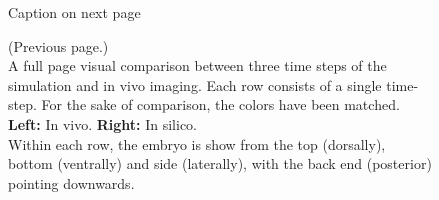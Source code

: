 \begin{figure}[H]
    \centering
    \vspace*{-1cm}\hspace*{-1cm}
    \caption{Caption on next page}
    \label{fig:big-visual-comparison}
\end{figure}
\newpage
\addtocounter{figure}{-1}
\begin{figure} [t!]
  \caption{(Previous page.) \\A full page visual comparison between three time steps of the simulation and in vivo imaging. 
  Each row consists of a single time-step. For the sake of comparison, the colors have been matched.\\
  \textbf{Left:} In vivo. \textbf{Right:} In silico.\\Within each row, the embryo is show from the top (dorsally), bottom (ventrally) and side (laterally), with the back end (posterior) pointing downwards.}
\end{figure}



